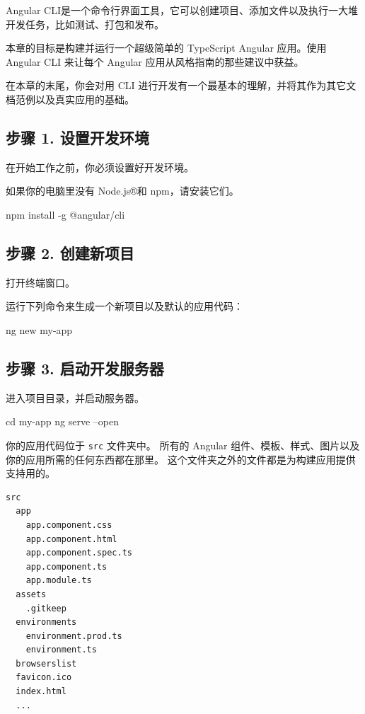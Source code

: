 \documentclass{../utils/progartcn}
\begin{document}
Angular CLI是一个命令行界面工具，它可以创建项目、添加文件以及执行一大堆开发任务，比如测试、打包和发布。

本章的目标是构建并运行一个超级简单的 TypeScript Angular 应用。使用 Angular CLI 来让每个 Angular 应用从风格指南的那些建议中获益。

在本章的末尾，你会对用 CLI 进行开发有一个最基本的理解，并将其作为其它文档范例以及真实应用的基础。

\subsection{步骤 1. 设置开发环境}

在开始工作之前，你必须设置好开发环境。

如果你的电脑里没有 Node.js®和 npm，请安装它们。

\begin{invertedshellbox}
npm install -g @angular/cli
\end{invertedshellbox}

\subsection{步骤 2. 创建新项目}

打开终端窗口。

运行下列命令来生成一个新项目以及默认的应用代码：

\begin{invertedshellbox}
ng new my-app
\end{invertedshellbox}

\subsection{步骤 3. 启动开发服务器}

进入项目目录，并启动服务器。

\begin{invertedshellbox}
cd my-app
ng serve --open
\end{invertedshellbox}

你的应用代码位于 \verb|src| 文件夹中。 所有的 Angular 组件、模板、样式、图片以及你的应用所需的任何东西都在那里。 这个文件夹之外的文件都是为构建应用提供支持用的。

\begin{lstlisting}[style=bashoutputstyle]
src
  app
    app.component.css
    app.component.html
    app.component.spec.ts
    app.component.ts
    app.module.ts
  assets
    .gitkeep
  environments
    environment.prod.ts
    environment.ts
  browserslist
  favicon.ico
  index.html
  ...
\end{lstlisting}
\end{document}
